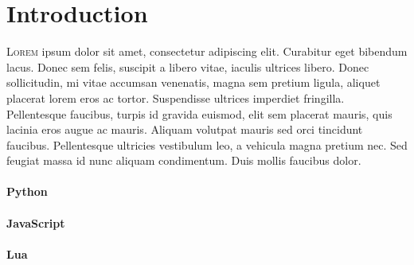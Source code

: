 \section{Introduction}

\lettrine[nindent=0em,lines=3]{L}{orem} ipsum dolor sit amet, consectetur adipiscing elit. Curabitur eget bibendum lacus. Donec sem felis, suscipit a libero vitae, iaculis ultrices libero. Donec sollicitudin, mi vitae accumsan venenatis, magna sem pretium ligula, aliquet placerat lorem eros ac tortor. Suspendisse ultrices imperdiet fringilla. Pellentesque faucibus, turpis id gravida euismod, elit sem placerat mauris, quis lacinia eros augue ac mauris. Aliquam volutpat mauris sed orci tincidunt faucibus. Pellentesque ultricies vestibulum leo, a vehicula magna pretium nec. Sed feugiat massa id nunc aliquam condimentum. Duis mollis faucibus dolor.

\paragraph{Python}


\paragraph{JavaScript}


\paragraph{Lua}

